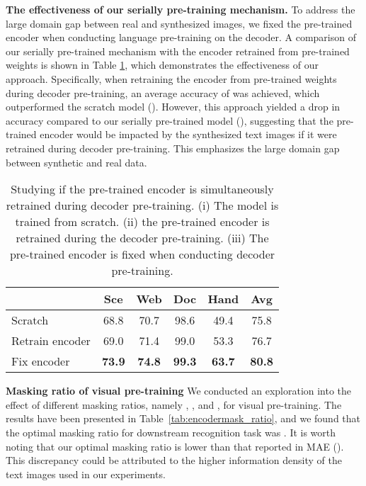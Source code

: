 \vspace{2mm}
\noindent\textbf{The effectiveness of our  serially pre-training mechanism.} To address the large domain gap between real and synthesized images, we fixed the pre-trained encoder when conducting language pre-training on the decoder. A comparison of our serially pre-trained mechanism with the encoder retrained from pre-trained weights is shown in Table \ref{tab:retraining_vs_fixing}, which demonstrates the effectiveness of our approach. Specifically, when retraining the encoder from pre-trained weights during decoder pre-training, an average accuracy of  was achieved, which outperformed the scratch model (). However, this approach yielded a  drop in accuracy compared to our serially pre-trained model (), suggesting that the pre-trained encoder would be impacted by the synthesized text images if it were retrained during decoder pre-training. This emphasizes the large domain gap between synthetic and real data.



\begin{table}[!t]
  \caption{Studying if the pre-trained encoder is simultaneously retrained during decoder pre-training. (i) The model is trained from scratch. (ii) the pre-trained encoder is retrained during the decoder pre-training. (iii) The pre-trained encoder is fixed when conducting decoder pre-training.}
  \label{tab:retraining_vs_fixing}
  \centering
  \setlength{\tabcolsep}{7pt}
  \begin{tabular}{lccccc}
    \toprule
    &Sce &Web &Doc &Hand &Avg\\
    \midrule
    Scratch &68.8 &70.7 &98.6 &49.4 &75.8 \\
    Retrain encoder &69.0 &71.4 &99.0 &53.3 &76.7 \\
    Fix encoder &\textbf{73.9} &\textbf{74.8} &\textbf{99.3} &\textbf{63.7} &\textbf{80.8} \\
  \bottomrule
\end{tabular}
\end{table}

\vspace{2mm}
\noindent\textbf{Masking ratio of visual pre-training} We conducted an exploration into the effect of different masking ratios, namely , , and , for visual pre-training. The results have been presented in Table~\ref{tab:encodermask_ratio}, and we found that the optimal masking ratio for downstream recognition task was . It is worth noting that our optimal masking ratio is lower than that reported in MAE \cite{mae} (). This discrepancy could be attributed to the higher information density of the text images used in our experiments.


